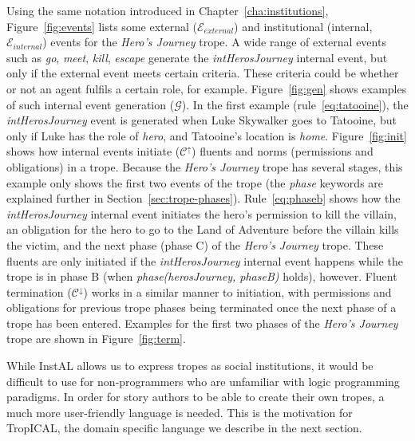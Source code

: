 \documentclass[11pt]{report}
\begin{document}
Using the same notation introduced in Chapter~\ref{cha:institutions}, Figure~\ref{fig:events} lists some external ($\mathcal{E}_{external}$) and institutional (internal, $\mathcal{E}_{internal}$) events for the \emph{Hero's Journey} trope. A wide range of external events such as \emph{go}, \emph{meet}, \emph{kill}, \emph{escape} generate the \emph{intHerosJourney} internal event, but only if the external event meets certain criteria. These criteria could be whether or not an agent fulfils a certain role, for example. Figure~\ref{fig:gen} shows examples of such internal event generation ($\mathcal{G}$). In the first example (rule~\ref{eq:tatooine}), the \emph{intHerosJourney} event is generated when Luke Skywalker goes to Tatooine, but only if Luke has the role of \emph{hero}, and Tatooine's location is \emph{home}.
Figure~\ref{fig:init} shows how internal events initiate
($\mathcal{C^{\uparrow}}$) fluents and norms (permissions and obligations) in a
trope. Because the \emph{Hero's Journey} trope has several stages, this example
only shows the first two events of the trope (the \emph{phase} keywords are explained further in Section~\ref{sec:trope-phases}). Rule~\ref{eq:phaseb} shows how the \emph{intHerosJourney} internal event initiates the hero's permission to kill the villain, an obligation for the hero to go to the Land of Adventure before the villain kills the victim, and the next phase (phase C) of the \emph{Hero's Journey} trope. These fluents are only initiated if the \emph{intHerosJourney} internal event happens while the trope is in phase B (when \emph{phase(herosJourney, phaseB)} holds), however.
Fluent termination ($\mathcal{C^{\downarrow}}$) works in a similar manner to initiation, with permissions and obligations for previous trope phases being terminated once the next phase of a trope has been entered. Examples for the first two phases of the \emph{Hero's Journey} trope are shown in Figure~\ref{fig:term}.

While InstAL allows us to express tropes as social institutions, it would be difficult to use for non-programmers who are unfamiliar with logic programming paradigms. In order for story authors to be able to create their own tropes, a much more user-friendly language is needed. This is the motivation for TropICAL, the domain specific language we describe in the next section.
\end{document}
